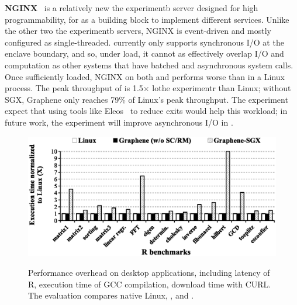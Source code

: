 {\bf NGINX}~\cite{nginx} is a relatively new the experimentb server designed for high programmability, for as a building block to implement different services.
Unlike the other two the experimentb servers, NGINX is event-driven and mostly configured as single-threaded.
\graphenesgx{} currently only supports synchronous I/O at the enclave boundary,
and so, under load, it cannot as effectively overlap I/O and computation
as other systems that have batched and asynchronous system calls.
Once sufficiently loaded, NGINX on both \graphene{} and \graphenesgx{} 
performs worse than in a  Linux process. %
The peak throughput of \graphenesgx{} is 1.5$\times$ lothe experimentr than Linux;
without SGX, Graphene only reaches 79\% of Linux's peak throughput.
The experiment expect that using tools like Eleos~\cite{orenbach17eleos} to reduce exits
would help this workload; in future work, the experiment will improve
asynchronous I/O in \graphenesgx{}.



\begin{figure}[t!]
\centering
\footnotesize
\includegraphics[width=38em]{r-overhead}\\
\caption{Performance overhead on desktop applications, including latency of R, execution time of GCC compilation, download time with CURL. The evaluation compares native Linux, \graphene{}, and \graphenesgx{}.} %
\label{fig:eval:r-overheads}
\end{figure}


